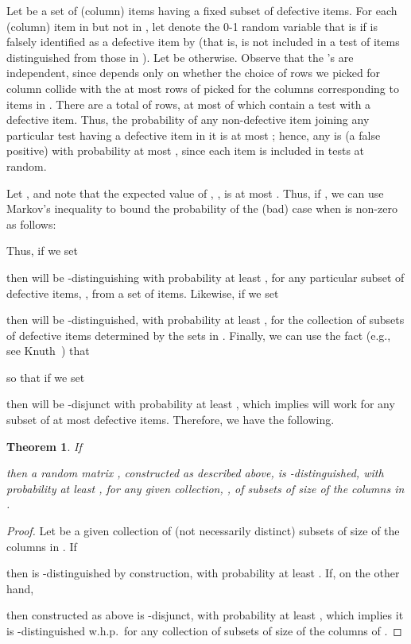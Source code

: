 \documentclass{article}
\newtheorem{theorem}{Theorem}
\begin{document}
Let  be a set of (column) items having a fixed 
subset  of  defective items.
For each (column) item  in  but not in , let  denote the
0-1 random variable that is  if  is falsely identified as
a defective item by  (that is,  is not included in a test of
items distinguished from those in ).
Let  be  otherwise.
Observe that the 's are independent, since  depends only on
whether the choice of rows we picked for column  collide with the
at most  rows of  picked for the columns corresponding
to items in .
There are a total of  rows, at most  of which contain a test
with a defective item.
Thus, the probability of any non-defective item joining any
particular test having a defective item in it is at most ;
hence, any  is  (a false positive)
with probability at most , since each item is included in 
 tests at random.

Let , and note that
the expected value of , , is at most .
Thus, if ,
we can use Markov's inequality to bound
the probability of the (bad) case when  is non-zero as follows:

Thus, if we set

then  will be -distinguishing with probability
at least , for any particular subset of defective items, ,
from a set  of  items.
Likewise, if we set 

then  will be -distinguished, with probability at least ,
for the collection of  subsets of defective items determined by
the sets in .
Finally, we can use the fact 
(e.g., see Knuth~\cite{k-acp-73})
that 

so that
if we set 

then  will be
-disjunct with probability at least , which implies  will work
for any subset of at most  defective items.
Therefore, we have the following.

\begin{theorem}
\label{thm:math}
If 

then a  random matrix ,
constructed as described above,
is -distinguished, with 
probability at least , for any given collection, 
, of 
subsets of size  of the  columns in .
\end{theorem}
\begin{proof}
Let  be a given collection of  (not necessarily distinct)
subsets of size  of the  columns in .
If 

then  is -distinguished by construction, with probability
at least .
If, on the other hand,

then  constructed as above
is -disjunct, with probability at least ,
which implies it is -distinguished w.h.p.~for any 
collection  of subsets of size  
of the  columns of .
\end{proof}
\end{document}
